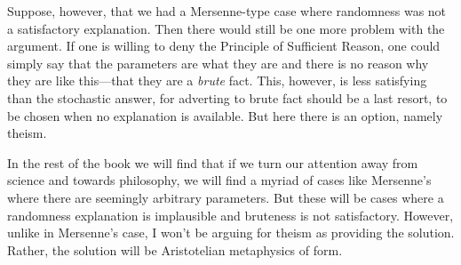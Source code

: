 Suppose, however, that we had a Mersenne-type case where randomness was not a satisfactory explanation. Then there would
still be one more problem with the argument. If one is willing to deny the Principle of Sufficient Reason, one could simply
say that the parameters are what they are and there is no reason why they are like this---that they are a \textit{brute} fact.
This, however, is less satisfying than the stochastic answer, for adverting to brute fact should be a last resort, to be
chosen when no explanation is available. But here there is an option, namely theism.

In the rest of the book we will find that if we turn our attention away from science and towards philosophy, we will
find a myriad of cases like Mersenne's where there are seemingly arbitrary parameters. But these will be cases where
a randomness explanation is implausible and bruteness is not satisfactory. However, unlike in Mersenne's case, I won't
be arguing for theism as providing the solution. Rather, the solution will be Aristotelian metaphysics of form.

\chaptertail 


